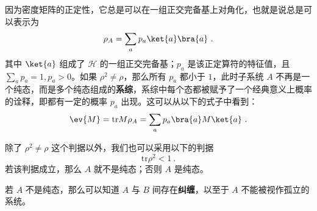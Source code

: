 因为密度矩阵的正定性，它总是可以在一组正交完备基上对角化，也就是说总是可以表示为
\begin{equation}
\rho_A=\sum_a p_a\ket{a}\bra{a}~.
\end{equation}
其中 $\ket{a}$ 组成了 $\mathcal{H}$ 的一组正交完备基；$p_a$ 是该正定算符的特征值，且 $\sum_a p_a=1,p_a>0$。如果 $\rho^2\neq \rho$，那么所有 $p_a$ 都小于 $1$，此时子系统 $A$ 不再是一个纯态，而是多个纯态组成的\textbf{系综}，系综中每个态都被赋予了一个经典意义上概率的诠释，即都有一定的概率 $p_a$ 出现。这可以从以下的式子中看到：
\begin{equation}
\ev{M}=\text{tr} M\rho_A = \sum_a p_a \bra{a}M\ket{a}~.
\end{equation}


除了 $\rho^2\neq \rho$ 这个判据以外，我们也可以采用以下的判据
\begin{equation}\label{eq_partra_2}
\text{tr} \rho^2 <1~.
\end{equation}
若该判据成立，那么 $A$ 就不是纯态；否则 $A$ 是纯态。

若 $A$ 不是纯态，那么可以知道 $A$ 与 $B$ 间存在\textbf{纠缠}，以至于 $A$ 不能被视作孤立的系统。